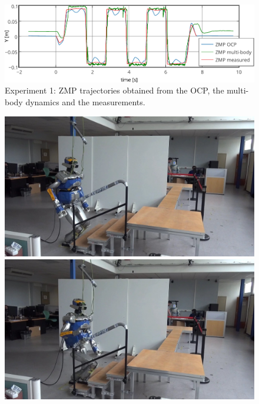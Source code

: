 \begin{figure}[!ht]
	\centering
	\includegraphics[width=1\linewidth]{./fig/zmp-walk-45cm.pdf}
		\caption{Experiment 1: ZMP trajectories obtained from the OCP, the multi-body dynamics and the measurements.}
		\label{fig:zmp_walk}
\end{figure}



\begin{figure}[!ht]
  \begin{center}
  \includegraphics[trim={7.0cm 0.0cm 20.0cm 0.0cm}, clip, width=0.2\widthValue]
    {./fig/stairclimbing1.jpeg}
  \includegraphics[trim={7.0cm 0.0cm 20.0cm 0.0cm}, clip, width=0.2\widthValue]
    {./fig/stairclimbing2.jpeg}

\end{center}
\end{figure}
